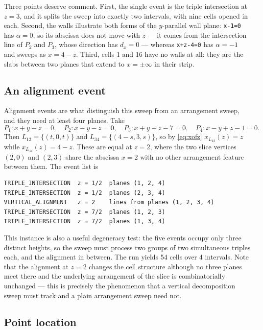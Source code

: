 \documentclass[11pt]{article}
\begin{document}
Three points deserve comment.  First, the single event is the triple
intersection at $z = 3$, and it splits the sweep into exactly two intervals,
with nine cells opened in each.  Second, the walls illustrate both forms of the
$y$-parallel wall plane: \texttt{x-1=0} has $\alpha = 0$, so its abscissa does
not move with $z$ --- it comes from the intersection line of $P_2$ and $P_3$,
whose direction has $d_x = 0$ --- whereas \texttt{x+z-4=0} has $\alpha = -1$ and
sweeps as $x = 4 - z$.
Third, cells 1 and 16 have no walls at all: they are the slabs between two
planes that extend to $x = \pm\infty$ in their strip.

\subsection{An alignment event}

Alignment events are what distinguish this sweep from an arrangement sweep, and
they need at least four planes.  Take
\[
  P_1: x + y - z = 0,\quad
  P_2: x - y - z = 0,\quad
  P_3: x + y + z - 7 = 0,\quad
  P_4: x - y + z - 1 = 0 .
\]
Then $L_{12} = \{(t,0,t)\}$ and $L_{34} = \{(4-s,3,s)\}$, so by \eqref{eq:xofz}
$x_{L_{12}}(z) = z$ while $x_{L_{34}}(z) = 4 - z$.  These are equal at $z = 2$,
where the two slice vertices $(2,0)$ and $(2,3)$ share the abscissa $x = 2$ with
no other arrangement feature between them.  The event list is

\begin{lstlisting}
TRIPLE_INTERSECTION  z = 1/2  planes (1, 2, 4)
TRIPLE_INTERSECTION  z = 1/2  planes (2, 3, 4)
VERTICAL_ALIGNMENT   z = 2    lines from planes (1, 2, 3, 4)
TRIPLE_INTERSECTION  z = 7/2  planes (1, 2, 3)
TRIPLE_INTERSECTION  z = 7/2  planes (1, 3, 4)
\end{lstlisting}

This instance is also a useful degeneracy test: the five events occupy only
three distinct heights, so the sweep must process two groups of two
simultaneous triples each, and the alignment in between.  The run yields 54
cells over 4 intervals.  Note that the alignment at $z=2$ changes the cell
structure although no three planes meet there and the underlying arrangement of
the slice is combinatorially unchanged --- this is precisely the phenomenon
that a vertical decomposition sweep must track and a plain arrangement sweep
need not.

\subsection{Point location}
\end{document}
